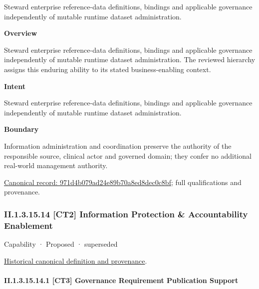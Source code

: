Steward enterprise reference-data definitions, bindings and applicable governance independently of mutable runtime dataset administration.



\textbf{Overview}



Steward enterprise reference-data definitions, bindings and applicable governance independently of mutable runtime dataset administration. The reviewed hierarchy assigns this enduring ability to its stated business-enabling context.



\textbf{Intent}



Steward enterprise reference-data definitions, bindings and applicable governance independently of mutable runtime dataset administration.



\textbf{Boundary}



Information administration and coordination preserve the authority of the responsible source, clinical actor and governed domain; they confer no additional real-world management authority.


{\footnotesize \href{../../../../continuum/strategy/capability/971d4b079ad24e89b70a8ed8dec0c8bf.md}{Canonical record: 971d4b079ad24e89b70a8ed8dec0c8bf}; full qualifications and provenance.}\par
\subsubsection*{II.1.3.15.14 [CT2] Information Protection \& Accountability Enablement}
\label{navigation:II.1.3.15.14}

\label{element:e922cba7cf1d4ebeb9abf6472a3803ce}
{\small Capability · Proposed · superseded}\par
\href{../../../../continuum/strategy/capability/e922cba7cf1d4ebeb9abf6472a3803ce.md}{Historical canonical definition and provenance}.\par
\paragraph*{II.1.3.15.14.1 [CT3] Governance Requirement Publication Support}
\label{navigation:II.1.3.15.14.1}

